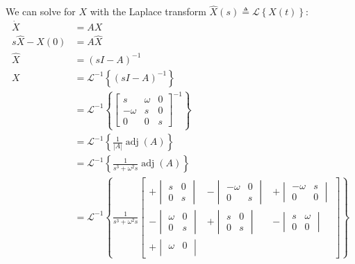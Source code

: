 \documentclass[11pt]{article}
\newcommand{\Lwrap}[1]{\left\{#1\right\}}
\newcommand{\Lagr}[1]{\mathcal{L}\Lwrap{#1}}
\newcommand{\Lagri}[1]{\mathcal{L}^{-1}\Lwrap{#1}}
\begin{document}
We can solve for \(X\) with the Laplace transform \(\hat{X}(s) \triangleq \Lagr{X(t)}\):
\begin{align*}
\dot{X} &= AX \\
s\hat{X} - X(0) &= A\hat{X} \\
\hat{X} &= (sI - A)^{-1} \\
X &= \Lagri{(sI - A)^{-1}} \\
&=
\Lagri{
    \begin{bmatrix}
    s       & \omega & 0 \\
    -\omega & s      & 0 \\
    0       & 0      & s
    \end{bmatrix}^{-1}
}\\
&=
\Lagri{
    \frac{1}{|A|}
    \operatorname{adj}(A)
}\\
&=
\Lagri{
    \frac{1}{s^3 + \omega^2 s}
    \operatorname{adj}(A)
}\\
&=
\Lagri{
    \frac{1}{s^3 + \omega^2 s}
    \begin{bmatrix}
        +
        \begin{vmatrix}
        s & 0 \\
        0 & s
        \end{vmatrix}
        &
        -
        \begin{vmatrix}
        -\omega & 0 \\
        0       & s
        \end{vmatrix}
        &
        +
        \begin{vmatrix}
        -\omega & s \\
        0       & 0
        \end{vmatrix}
        \\
        -
        \begin{vmatrix}
        \omega & 0 \\
        0      & s
        \end{vmatrix}
        &
        +
        \begin{vmatrix}
        s & 0 \\
        0 & s
        \end{vmatrix}
        &
        -
        \begin{vmatrix}
        s & \omega \\
        0 & 0
        \end{vmatrix}
        \\
        +
        \begin{vmatrix}
        \omega & 0 \\

\end{vmatrix}
\end{bmatrix}}
\end{align*}
\end{document}
